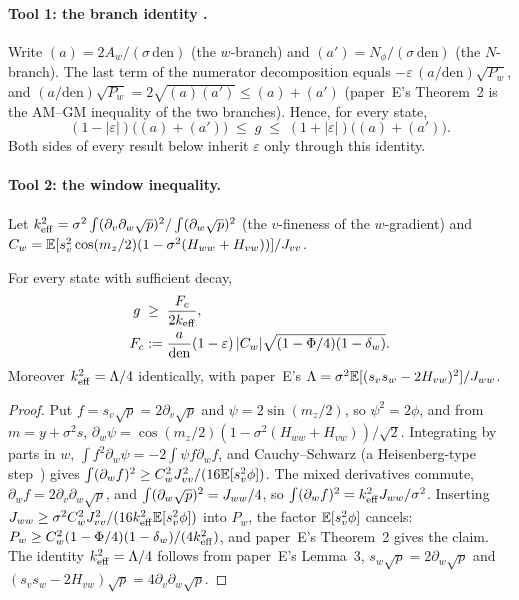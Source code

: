 \paragraph*{Tool 1: the branch identity \proofst.}
Write $(a)=2A_w/(\sigma\,\mathrm{den})$ (the $w$-branch) and $(a')=N_\phi/(\sigma\,\mathrm{den})$ (the $N$-branch). The last term of the numerator
decomposition equals $-\varepsilon\,(a/\mathrm{den})\sqrt{P_w}$, and $(a/\mathrm{den})\sqrt{P_w}=2\sqrt{(a)(a')}\le(a)+(a')$ (paper~E's Theorem~2 is the
AM--GM inequality of the two branches). Hence, for every state,
\begin{equation}
(1-|\varepsilon|)\big((a)+(a')\big)\;\le\;g\;\le\;(1+|\varepsilon|)\big((a)+(a')\big).
\label{eq:branch}
\end{equation}
Both sides of every result below inherit $\varepsilon$ only through this identity.

\paragraph*{Tool 2: the window inequality.}
Let $k_{\mathrm{eff}}^2=\sigma^2\int(\partial_v\partial_w\sqrt p)^2/\int(\partial_w\sqrt p)^2$ (the $v$-fineness of the $w$-gradient) and
$C_w=\mathbb{E}[s_v^2\cos(m_z/2)(1-\sigma^2(H_{ww}+H_{vw}))]/J_{vv}$.

\begin{theorem} \proofst
\label{thm:AT2}
For every state with sufficient decay,
\begin{equation}
\begin{aligned}g\;&\ge\;\frac{F_c}{2k_{\mathrm{eff}}},\\ F_c&:=\frac{a}{\mathrm{den}}(1-\varepsilon)\,|C_w|\sqrt{(1-\Phi/4)(1-\delta_w)} .\end{aligned}
\end{equation}
Moreover $k_{\mathrm{eff}}^2=\Lambda/4$ identically, with paper~E's $\Lambda=\sigma^2\mathbb{E}[(s_vs_w-2H_{vw})^2]/J_{ww}$.
\end{theorem}
\begin{proof}
Put $f=s_v\sqrt p=2\partial_v\sqrt p$ and $\psi=2\sin(m_z/2)$, so $\psi^2=2\phi$, and from $m=y+\sigma^2s$,
$\partial_w\psi=\cos(m_z/2)(1-\sigma^2(H_{ww}+H_{vw}))/\sqrt2$. Integrating by parts in $w$, $\int f^2\partial_w\psi=-2\int\psi f\partial_wf$, and
Cauchy--Schwarz (a Heisenberg-type step~\cite{Stam1959}) gives $\int(\partial_wf)^2\ge C_w^2J_{vv}^2/(16\mathbb{E}[s_v^2\phi])$. The mixed derivatives commute,
$\partial_wf=2\partial_v\partial_w\sqrt p$, and $\int(\partial_w\sqrt p)^2=J_{ww}/4$, so $\int(\partial_wf)^2=k_{\mathrm{eff}}^2J_{ww}/\sigma^2$. Inserting
$J_{ww}\ge\sigma^2C_w^2J_{vv}^2/(16k_{\mathrm{eff}}^2\mathbb{E}[s_v^2\phi])$ into $P_w$, the factor $\mathbb{E}[s_v^2\phi]$ cancels:
$P_w\ge C_w^2(1-\Phi/4)(1-\delta_w)/(4k_{\mathrm{eff}}^2)$, and paper~E's Theorem~2 gives the claim. The identity $k_{\mathrm{eff}}^2=\Lambda/4$ follows from
paper~E's Lemma~3, $s_w\sqrt p=2\partial_w\sqrt p$ and $(s_vs_w-2H_{vw})\sqrt p=4\partial_v\partial_w\sqrt p$.
\end{proof}

